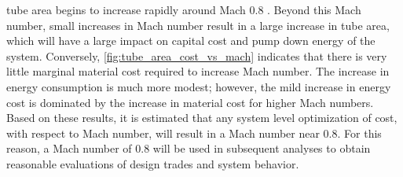 tube area begins to increase rapidly around Mach 0.8 \cite{Chin}.
Beyond this Mach number, small increases in Mach number result in a large
increase in tube area, which will have a large impact on capital cost and pump
down energy of the system. Conversely, \cref{fig:tube_area_cost_vs_mach}
indicates that there is very little marginal material cost required to increase
Mach number. The increase in energy consumption is much more modest; however,
the mild increase in energy cost is dominated by the increase in material cost
for higher Mach numbers. Based on these results, it is estimated that any
system level optimization of cost, with respect to Mach number, will result in a
Mach number near 0.8. For this reason, a Mach number of 0.8 will be used in
subsequent analyses to obtain reasonable evaluations of design trades and system behavior.
